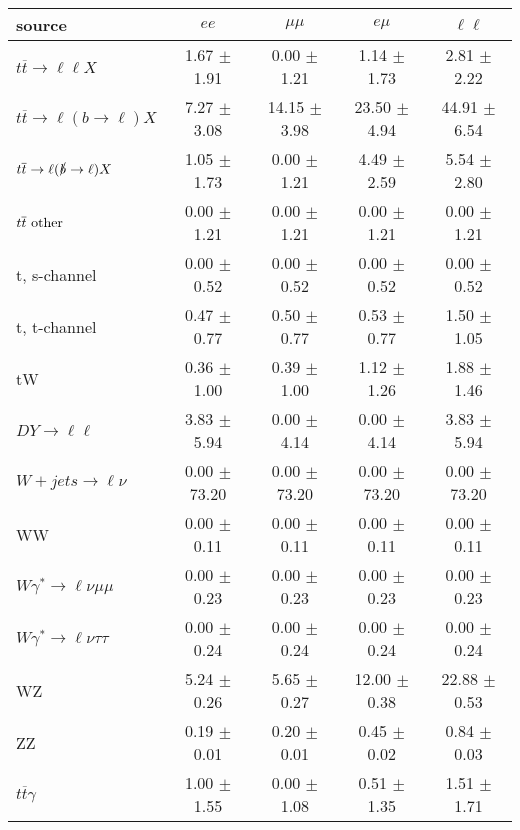 \begin{tabular}{l|cccc} \hline\hline
source & $ee$ & $\mu\mu$ & $e\mu$ & $\ell\ell $ \\
\hline
$t\overline{t} \rightarrow \ell \ell X$ &  1.67 $\pm$  1.91 &  0.00 $\pm$  1.21 &  1.14 $\pm$  1.73 &  2.81 $\pm$  2.22 \\
$t\overline{t} \rightarrow \ell (b \rightarrow \ell) X$ &  7.27 $\pm$  3.08 & 14.15 $\pm$  3.98 & 23.50 $\pm$  4.94 & 44.91 $\pm$  6.54 \\
$t\overline{t} \rightarrow \ell (\slashed b \rightarrow \ell) X$ &  1.05 $\pm$  1.73 &  0.00 $\pm$  1.21 &  4.49 $\pm$  2.59 &  5.54 $\pm$  2.80 \\
        $t\overline{t}\ \rm{other}$ &  0.00 $\pm$  1.21 &  0.00 $\pm$  1.21 &  0.00 $\pm$  1.21 &  0.00 $\pm$  1.21 \\
\hline
                       t, s-channel &  0.00 $\pm$  0.52 &  0.00 $\pm$  0.52 &  0.00 $\pm$  0.52 &  0.00 $\pm$  0.52 \\
                       t, t-channel &  0.47 $\pm$  0.77 &  0.50 $\pm$  0.77 &  0.53 $\pm$  0.77 &  1.50 $\pm$  1.05 \\
                                 tW &  0.36 $\pm$  1.00 &  0.39 $\pm$  1.00 &  1.12 $\pm$  1.26 &  1.88 $\pm$  1.46 \\
\hline
         $DY \rightarrow \ell \ell$ &  3.83 $\pm$  5.94 &  0.00 $\pm$  4.14 &  0.00 $\pm$  4.14 &  3.83 $\pm$  5.94 \\
      $W+jets \rightarrow \ell \nu$ &  0.00 $\pm$ 73.20 &  0.00 $\pm$ 73.20 &  0.00 $\pm$ 73.20 &  0.00 $\pm$ 73.20 \\
                                 WW &  0.00 $\pm$  0.11 &  0.00 $\pm$  0.11 &  0.00 $\pm$  0.11 &  0.00 $\pm$  0.11 \\
\hline
$W\gamma^{*} \rightarrow \ell \nu \mu\mu$ &  0.00 $\pm$  0.23 &  0.00 $\pm$  0.23 &  0.00 $\pm$  0.23 &  0.00 $\pm$  0.23 \\
$W\gamma^{*} \rightarrow \ell \nu \tau\tau$ &  0.00 $\pm$  0.24 &  0.00 $\pm$  0.24 &  0.00 $\pm$  0.24 &  0.00 $\pm$  0.24 \\
                                 WZ &  5.24 $\pm$  0.26 &  5.65 $\pm$  0.27 & 12.00 $\pm$  0.38 & 22.88 $\pm$  0.53 \\
                                 ZZ &  0.19 $\pm$  0.01 &  0.20 $\pm$  0.01 &  0.45 $\pm$  0.02 &  0.84 $\pm$  0.03 \\
\hline
              $t\overline{t}\gamma$ &  1.00 $\pm$  1.55 &  0.00 $\pm$  1.08 &  0.51 $\pm$  1.35 &  1.51 $\pm$  1.71 \\

\end{tabular}
